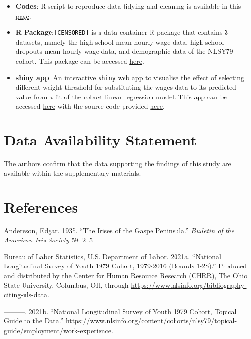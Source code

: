 \documentclass{article}
\begin{document}
\begin{itemize}
\item
  \textbf{Codes}: R script to reproduce data tidying and cleaning is available in this \href{CENSORED/articles/process-data.html}{page}.
\item
  \textbf{R Package}:\texttt{[CENSORED]} is a data container R package that contains 3 datasets, namely the high school mean hourly wage data, high school dropouts mean hourly wage data, and demographic data of the NLSY79 cohort. This package can be accessed \href{CENSORED}{here}.
\item
  \textbf{shiny app}: An interactive \texttt{shiny} web app to visualise the effect of selecting different weight threshold for substituting the wages data to its predicted value from a fit of the robust linear regression model. This app can be accessed \href{CENSORED}{here} with the source code provided \href{CENSORED/tree/master/app}{here}.
\end{itemize}

\hypertarget{data-availability-statement}{%
\section{Data Availability Statement}\label{data-availability-statement}}

The authors confirm that the data supporting the findings of this study are available within the supplementary materials.

\hypertarget{references}{%
\section*{References}\label{references}}

\hypertarget{refs}{}
\leavevmode\hypertarget{ref-iris-data}{}%
Andereson, Edgar. 1935. ``The Irises of the Gaspe Peninsula.'' \emph{Bulletin of the American Iris Society} 59: 2--5.

\leavevmode\hypertarget{ref-nlsy79}{}%
Bureau of Labor Statistics, U.S. Department of Labor. 2021a. ``National Longitudinal Survey of Youth 1979 Cohort, 1979-2016 (Rounds 1-28).'' Produced and distributed by the Center for Human Resource Research (CHRR), The Ohio State University. Columbus, OH, through \url{https://www.nlsinfo.org/bibliography-citing-nls-data}.

\leavevmode\hypertarget{ref-nlsy79guide}{}%
---------. 2021b. ``National Longitudinal Survey of Youth 1979 Cohort, Topical Guide to the Data.'' \url{https://www.nlsinfo.org/content/cohorts/nlsy79/topical-guide/employment/work-experience}.
\end{document}
